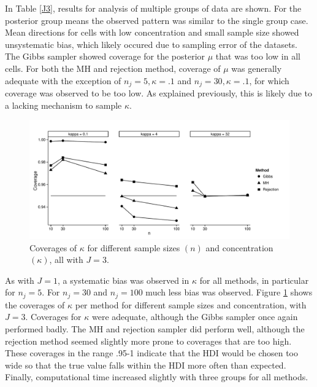 \documentclass[]{gSCS2e}
\theoremstyle{plain}
\theoremstyle{definition}
\theoremstyle{remark}
\begin{document}
In Table \ref{J3}, results for analysis of multiple groups of data are shown. For the posterior group means the observed pattern was similar to the single group case. Mean directions for cells with low concentration and small sample size showed unsystematic bias, which likely occured due to sampling error of the datasets. The Gibbs sampler showed coverage for the posterior $\mu$ that was too low in all cells. For both the MH and rejection method, coverage of $\mu$ was generally adequate with the exception of $n_j=5, \kappa=.1$ and $n_j=30, \kappa=.1$, for which coverage was observed to be too low. As explained previously, this is likely due to a lacking mechanism to sample $\kappa$. 




\begin{figure}[bt]
\includegraphics[width=\textwidth]{Coverages.pdf}
\caption{Coverages of $\kappa$ for different sample sizes $(n)$ and concentration $(\kappa)$, all with $J=3$.}
\label{coverage}
\end{figure}



As with $J=1$, a systematic bias was observed in $\kappa$ for all methods, in particular for $n_j=5$. For $n_j=30$ and $n_j=100$ much less bias was observed. Figure \ref{coverage} shows the coverages of $\kappa$ per method for different sample sizes and concentration, with $J=3$. Coverages for $\kappa$ were adequate, although the Gibbs sampler once again performed badly.  The MH and rejection sampler did perform well, although the rejection method seemed slightly more prone to coverages that are too high. These coverages in the range .95-1 indicate that the HDI would be chosen too wide so that the true value falls within the HDI more often than expected. Finally, computational time increased slightly with three groups for all methods.
\end{document}
